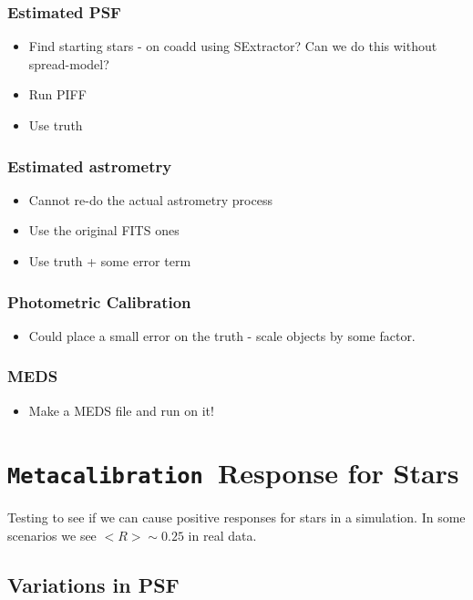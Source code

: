 \documentclass[\docopts]{\docclass}
\newcommand{\Mcal}{\texttt{Metacalibration}}
\begin{document}
\subsubsection{Estimated PSF}
\begin{itemize}
\item Find starting stars - on coadd using SExtractor? Can we do this without spread-model?
\item Run PIFF
\item Use truth
\end{itemize}

\subsubsection{Estimated astrometry}
\begin{itemize}
\item Cannot re-do the actual astrometry process
\item Use the original FITS ones
\item Use truth + some error term
\end{itemize}

\subsubsection{Photometric Calibration}
\begin{itemize}
\item Could place a small error on the truth - scale objects by some factor.
\end{itemize}

\subsubsection{MEDS}
\begin{itemize}
\item Make a MEDS file and run on it!
\end{itemize}



\section{\Mcal\ Response for Stars}

Testing to see if we can cause positive responses for stars in a simulation.
In some scenarios we see $<R> \sim 0.25$ in real data.

\subsection{Variations in PSF}
\end{document}
